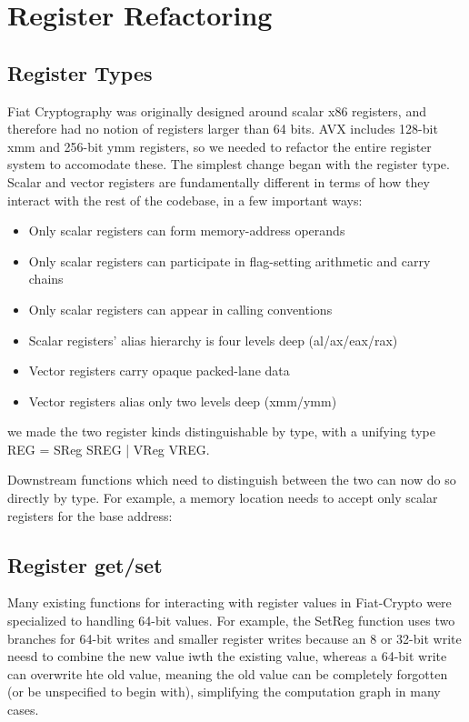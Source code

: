 \chapter{Register Refactoring}
\label{ch:registers}


\section{Register Types}

Fiat Cryptography was originally designed around scalar x86 registers, and therefore had no notion of registers larger than 64 bits. AVX includes 128-bit xmm and 256-bit ymm registers, so we needed to refactor the entire register system to accomodate these. 
The simplest change began with the register type. Scalar and vector registers are fundamentally different in terms of how they interact with the rest of the codebase, in a few important ways:
\begin{itemize}
    \item Only scalar registers can form memory-address operands
    \item Only scalar registers can participate in flag-setting arithmetic and carry chains
    \item Only scalar registers can appear in calling conventions
    \item Scalar registers' alias hierarchy is four levels deep (al/ax/eax/rax)
    \item Vector registers carry opaque packed-lane data
    \item Vector registers alias only two levels deep (xmm/ymm)
\end{itemize} we made the two register kinds distinguishable by type, with a unifying type REG = SReg SREG | VReg VREG.


Downstream functions which need to distinguish between the two can now do so directly by type. For example, a memory location needs to accept only scalar registers for the base address:



\section{Register get/set}

Many existing functions for interacting with register values in Fiat-Crypto were specialized to handling 64-bit values. For example, the SetReg function uses two branches for 64-bit writes and smaller register writes because an 8 or 32-bit write neesd to combine the new value iwth the existing value, whereas a 64-bit write can overwrite hte old value, meaning the old value can be completely forgotten (or be unspecified to begin with), simplifying the computation graph in many cases.

